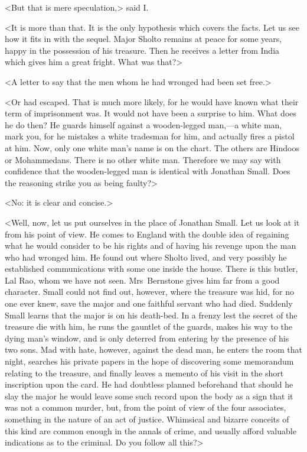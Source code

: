 <But that is mere speculation,> said I\@.

<It is more than that. It is the only hypothesis which covers the facts. Let us see how it fits in with the sequel. Major Sholto remains at peace for some years, happy in the possession of his treasure. Then he receives a letter from India which gives him a great fright. What was that?>

<A letter to say that the men whom he had wronged had been set free.>

<Or had escaped. That is much more likely, for he would have known what their term of imprisonment was. It would not have been a surprise to him. What does he do then? He guards himself against a wooden-legged man,—a white man, mark you, for he mistakes a white tradesman for him, and actually fires a pistol at him. Now, only one white man's name is on the chart. The others are Hindoos or Mohammedans. There is no other white man. Therefore we may say with confidence that the wooden-legged man is identical with Jonathan Small. Does the reasoning strike you as being faulty?>

<No: it is clear and concise.>

<Well, now, let us put ourselves in the place of Jonathan Small. Let us look at it from his point of view. He comes to England with the double idea of regaining what he would consider to be his rights and of having his revenge upon the man who had wronged him. He found out where Sholto lived, and very possibly he established communications with some one inside the house. There is this butler, Lal Rao, whom we have not seen. Mrs~Bernstone gives him far from a good character. Small could not find out, however, where the treasure was hid, for no one ever knew, save the major and one faithful servant who had died. Suddenly Small learns that the major is on his death-bed. In a frenzy lest the secret of the treasure die with him, he runs the gauntlet of the guards, makes his way to the dying man's window, and is only deterred from entering by the presence of his two sons. Mad with hate, however, against the dead man, he enters the room that night, searches his private papers in the hope of discovering some memorandum relating to the treasure, and finally leaves a memento of his visit in the short inscription upon the card. He had doubtless planned beforehand that should he slay the major he would leave some such record upon the body as a sign that it was not a common murder, but, from the point of view of the four associates, something in the nature of an act of justice. Whimsical and bizarre conceits of this kind are common enough in the annals of crime, and usually afford valuable indications as to the criminal. Do you follow all this?>

